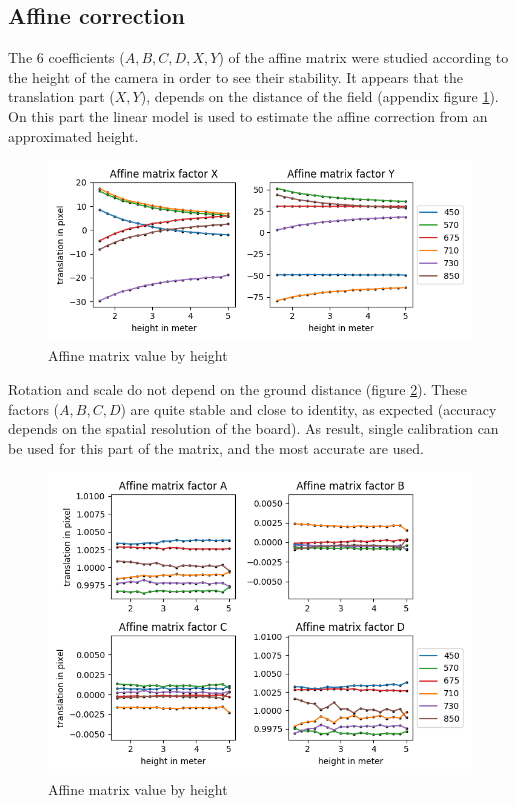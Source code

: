 \documentclass[]{elsarticle}
\begin{document}
	\subsection{Affine correction}
	
	The 6 coefficients ($A,B,C,D,X,Y$) of the affine matrix were studied according to the height of the camera in order to see their stability.
	It appears that the translation part ($X,Y$), depends on the distance of the field (appendix figure \ref{fig:affine-translation-height}).
	On this part the linear model is used to estimate the affine correction from an approximated height.
	
	\begin{figure}[H]
		\centering
		\includegraphics[width=0.5\linewidth]{../figures/affine-translation-height.png}
		\caption{Affine matrix value by height}
		\label{fig:affine-translation-height}
	\end{figure}

	Rotation and scale do not depend on the ground distance (figure \ref{fig:affine-rotation-height}).
	These factors ($A,B,C,D$) are quite stable and close to identity, as expected (accuracy depends on the spatial resolution of the board).
	As result, single calibration can be used for this part of the matrix, and the most accurate are used.
	
	\begin{figure}[H]
		\centering
		\includegraphics[width=0.5\linewidth]{../figures/affine-rotation-height.png}
		\caption{Affine matrix value by height}
		\label{fig:affine-rotation-height}
	\end{figure}
	
\end{document}
